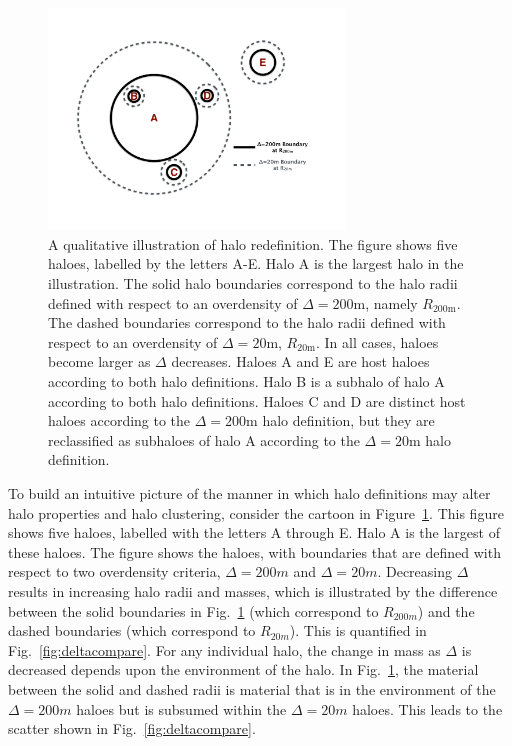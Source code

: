 \documentclass[usenatbib,fleqn]{mnras}
\begin{document}
\begin{figure}
\centering
\includegraphics[width=0.7\textwidth]{cartoon_halos.pdf}
\caption{
A qualitative illustration of halo redefinition. The figure shows five haloes, labelled by the letters A-E. Halo A is the largest halo in the illustration. The solid halo boundaries correspond to the halo radii defined with respect to an overdensity of $\Delta=200$m, namely $R_{200\text{m}}$. The dashed boundaries correspond to the halo radii defined with respect to an overdensity of $\Delta=20$m, $R_{20\text{m}}$. In all cases, haloes become larger as $\Delta$ decreases. Haloes A and E are host haloes according to both halo definitions. Halo B is a subhalo of halo A according to both halo definitions. Haloes C and D are distinct host haloes according to the $\Delta=200$m halo definition, but they are reclassified as subhaloes of halo A according to the $\Delta=20$m halo definition.
}
\label{fig:halocartoon}
\end{figure}

To build an intuitive picture of the manner in which halo definitions may alter halo properties and halo clustering, consider the cartoon in Figure~\ref{fig:halocartoon}. This figure shows five haloes, labelled with the letters A through E. Halo A is the largest of these haloes. The figure shows the haloes, with boundaries that are defined with respect to two overdensity criteria, $\Delta=200m$ and $\Delta=20m$. Decreasing $\Delta$ results in increasing halo radii and masses, which is illustrated by the difference between the solid boundaries in Fig.~\ref{fig:halocartoon} (which correspond to $R_{200m}$) and the dashed boundaries (which correspond to $R_{20m}$). This is quantified in Fig.~\ref{fig:deltacompare}. For any individual halo, the change in mass as $\Delta$ is decreased depends upon the environment of the halo. In Fig.~\ref{fig:halocartoon}, the material between the solid and dashed radii is material that is in the environment of the $\Delta=200m$ haloes but is subsumed within the $\Delta=20m$ haloes. This leads to the scatter shown in Fig.~\ref{fig:deltacompare}. 
\end{document}
